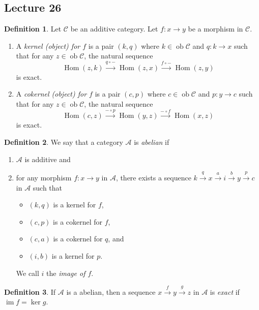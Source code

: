 \documentclass[10pt,letterpaper,cm]{nupset}
\theoremstyle{definition}
\newtheorem*{definition}{Definition}
\newcommand{\1}{\mathbf{1}}
\renewcommand{\a}{\mathscr{A}}
\renewcommand{\c}{\mathscr{C}}
\newcommand{\0}{\vec 0}
\DeclareMathOperator{\im}{im}
\DeclareMathOperator{\ob}{ob}
\DeclareMathOperator{\Hom}{Hom}
\begin{document}
\subsection{Lecture 26}

\begin{definition}
Let $\c$ be an additive category. Let $f: x \to y$ be a morphism in $\c$. 
\begin{enumerate}
\item A \textit{kernel (object) for $f$} is a pair $(k, q)$ where $k \in \ob{\c}$ and $q : k \to x$ such that for any $z \in \ob{\c}$, the natural sequence $$ \Hom(z,k) \overset{q\circ {-}}{\longrightarrow} \Hom(z,x) \overset{f\circ {-}}{\longrightarrow} \Hom(z,y)   $$ is exact.
\item  A \textit{cokernel (object) for $f$} is a pair $(c, p)$ where $c \in \ob{\c}$ and $p : y \to c$ such that for any $z \in \ob{\c}$, the natural sequence $$ \Hom(c,z) \overset{{-}\circ p}{\longrightarrow} \Hom(y,z) \overset{{-}\circ f}{\longrightarrow} \Hom(x,z)   $$ is exact.
\end{enumerate}
\end{definition}

\begin{definition}
We say that a category $\a$ is \textit{abelian} if
\begin{enumerate}
\item $\a$ is additive and
\item for any morphism $f : x \to y$ in $\a$, there exists a sequence $k \overset{q}{\longrightarrow} x  \overset{a}{\longrightarrow} i \overset{b}{\longrightarrow}y \overset{p}{\longrightarrow} c$ in $\a$ such that
\begin{itemize}
\item $(k, q)$ is a kernel for $f$,
\item $(c, p)$ is a cokernel for $f$,
\item $(c, a)$ is a cokernel for $q$, and
\item $(i,b)$ is a kernel for $p$.
\end{itemize}
We call $i$ the \textit{image of $f$}.
\end{enumerate}
\end{definition}

\begin{definition}
If $\a$ is a abelian, then a sequence $x \overset{f}{\longrightarrow} y \overset{g}{\longrightarrow} z$ in $\a$ is \textit{exact} if $\im{f} = \ker{g}$.
\end{definition}
\end{document}
